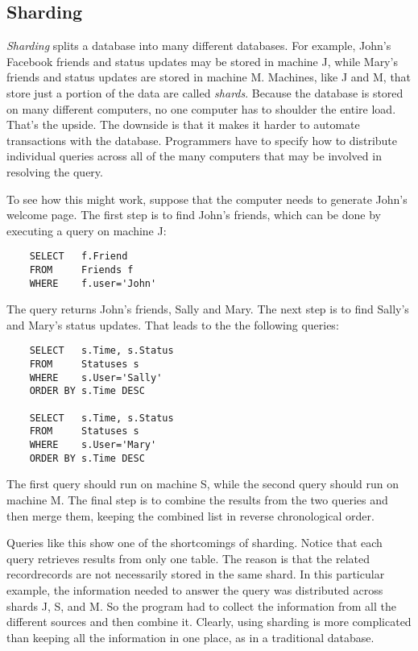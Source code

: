 \subsection{Sharding}

\emph{Sharding} splits a database into many different databases.
For example, John's Facebook friends and status updates may be stored in machine J, while
Mary's friends and status updates are stored in machine M.
Machines, like J and M, that store just a portion of the data are called \emph{shards}.
Because the database is stored on many different computers,
no one computer has to shoulder the entire load.
That's the upside.
The downside is that it makes it harder 
to automate transactions with the database.
Programmers have to specify how to distribute 
individual queries across all of the many computers
that may be involved in resolving the query.

To see how this might work,
suppose that the computer needs to generate John's welcome page.
The first step is to find John's friends, 
which can be done by executing a query on machine J:
\begin{verbatim}
	SELECT   f.Friend
	FROM     Friends f
	WHERE    f.user='John'
\end{verbatim}
The query returns John's friends, Sally and Mary.
The next step is to find Sally's and Mary's status updates.
That leads to the the following queries:
\begin{verbatim}
	SELECT   s.Time, s.Status
	FROM     Statuses s
	WHERE    s.User='Sally'
	ORDER BY s.Time DESC

	SELECT   s.Time, s.Status
	FROM     Statuses s
	WHERE    s.User='Mary'
	ORDER BY s.Time DESC
\end{verbatim}
The first query should run on machine S,
while the second query should run on machine M.
The final step is to combine the results from the two queries
and then merge them, keeping
the combined list in reverse chronological order.

Queries like this show one of the shortcomings of sharding.
Notice that each query retrieves results from only one table.
The reason is that the related recordrecords are not necessarily stored in the same shard.
In this particular example, the information needed to answer the query was
distributed across shards J, S, and M.
So the program had to collect the information 
from all the different sources and then combine it.
Clearly, using sharding is more complicated 
than keeping all the information in one place,
as in a traditional database.

